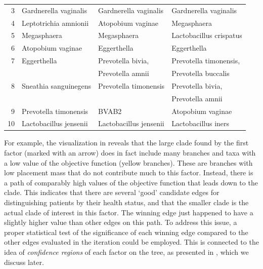 \begin{table}[p]
{\begin{center}
\begin{tabular}{rlll}
\rc{}   3    & Gardnerella vaginalis        & Gardnerella vaginalis   & Gardnerella vaginalis      \\
        4    & Leptotrichia amnionii        & Atopobium vaginae       & Megasphaera                \\
\rc{}   5    & Megasphaera                  & Megasphaera             & Lactobacillus crispatus    \\
        6    & Atopobium vaginae            & Eggerthella             & Eggerthella                \\
\rc{}   7    & Eggerthella                  & Prevotella bivia,       & Prevotella timonensis,     \\
\rc{}        &                              & Prevotella amnii        & Prevotella buccalis        \\
        8    & Sneathia sanguinegens        & Prevotella timonensis   & Prevotella bivia,          \\
             &                              &                         & Prevotella amnii           \\
\rc{}   9    & Prevotella timonensis        & BVAB2                   & Atopobium vaginae          \\
       10    & Lactobacillus jensenii       & Lactobacillus jensenii  & Lactobacillus iners        \\
        \bottomrule
    \end{tabular}
    \end{center}
}
\end{table}

For example, the visualization in  reveals
that the large clade found by the first factor (marked with an arrow) does in fact include many branches and taxa
with a low value of the objective function (yellow branches).
These are branches with low placement mass that do not contribute much to this factor.
Instead, there is a path of comparably high values of the objective function
that leads down to the  clade.
This indicates that there are several `good' candidate edges for distinguishing patients by their health status,
and that the smaller  clade is the actual clade of interest in this factor.
The winning edge just happened to have a slightly higher value than other edges on this path.
To address this issue, a proper statistical test of the significance of each winning edge
compared to the other edges evaluated in the iteration could be employed.
This is connected to the idea of \emph{confidence regions} of each factor on the tree,
as presented in \cite{Washburne2019}, which we discuss later.

